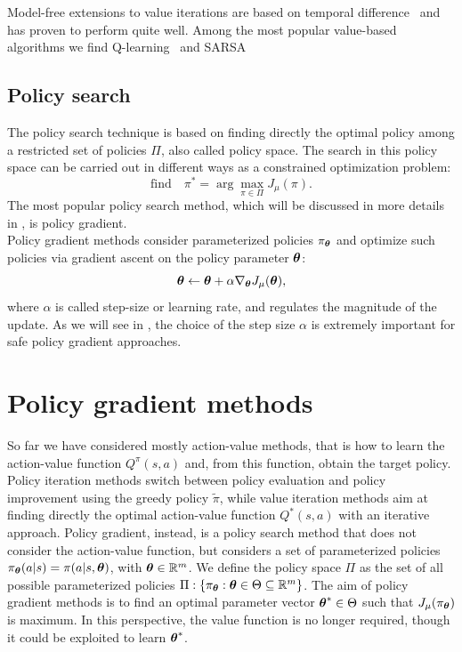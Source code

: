 Model-free extensions to value iterations are based on temporal difference~\cite{Sutton1988} and has proven to perform quite well. Among the most popular value-based algorithms we find Q-learning~\cite{Watkins1992} and SARSA~\cite{sarsa}


\subsection{Policy search}
The policy search technique is based on finding directly the optimal policy among a restricted set of policies $\Pi$, also called policy space. The search in this policy space can be carried out in different ways as a constrained optimization problem:
\[
\textrm{find}\quad \pi^* = \arg\max_{\pi\in\Pi}J_\mu(\pi).
\]
The most popular policy search method, which will be discussed in more details in , is policy gradient.\\
Policy gradient methods consider parameterized policies $\pi_{{\boldsymbol{\theta}}}$ and optimize such policies via gradient ascent on the policy parameter ${\boldsymbol{\theta}}$:
\[
{\boldsymbol{\theta}} \gets {\boldsymbol{\theta}} + \alpha\nabla_{{\boldsymbol{\theta}}}J_\mu({\boldsymbol{\theta}}),
\]
where $\alpha$ is called step-size or learning rate, and regulates the magnitude of the update. As we will see in , the choice of the step size $\alpha$ is extremely important for safe policy gradient approaches.

\section{Policy gradient methods}
\label{sec:policy-gradient}

So far we have considered mostly action-value methods, that is how to learn the action-value function $Q^\pi(s,a)$ and, from this function, obtain the target policy. Policy iteration methods switch between policy evaluation and policy improvement using the greedy policy $\tilde{\pi}$, while value iteration methods aim at finding directly the optimal action-value function $Q^*(s,a)$ with an iterative approach. Policy gradient, instead, is a policy search method that does not consider the action-value function, but considers a set of parameterized policies $\pi_{{\boldsymbol{\theta}}}(a|s)=\pi(a|s,{\boldsymbol{\theta}})$, with ${\boldsymbol{\theta}}\in\mathbb{R}^m$. We define the policy space $\Pi$ as the set of all possible parameterized policies $\Pi:\left\{\pi_{{\boldsymbol{\theta}}} : {\boldsymbol{\theta}}\in\Theta \subseteq \mathbb{R}^m\right\}$. The aim of policy gradient methods is to find an optimal parameter vector ${\boldsymbol{\theta}}^*\in\Theta$ such that $J_\mu(\pi_{{\boldsymbol{\theta}}})$ is maximum. In this perspective, the value function is no longer required, though it could be exploited to learn ${\boldsymbol{\theta}}^*$.

